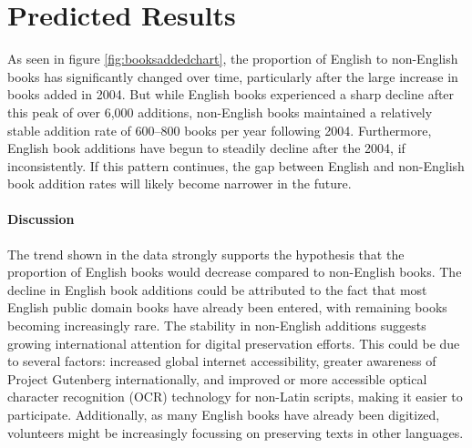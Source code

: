 \documentclass[11pt]{article}
\begin{document}
\section{Predicted Results}
As seen in figure \ref{fig:booksaddedchart}, the proportion of English to non-English books has significantly changed over time, particularly after the large increase in books added in 2004. But while English books experienced a sharp decline after this peak of over 6,000 additions, non-English books maintained a relatively stable addition rate of 600–800 books per year following 2004. Furthermore, English book additions have begun to steadily decline after the 2004, if inconsistently. If this pattern continues, the gap between English and non-English book addition rates will likely become narrower in the future.

\paragraph{Discussion} 
The trend shown in the data strongly supports the hypothesis that the proportion of English books would decrease compared to non-English books. The decline in English book additions could be attributed to the fact that most English public domain books have already been entered, with remaining books becoming increasingly rare. The stability in non-English additions suggests growing international attention for digital preservation efforts. This could be due to several factors: increased global internet accessibility, greater awareness of Project Gutenberg internationally, and improved or more accessible optical character recognition (OCR) technology for non-Latin scripts, making it easier to participate. Additionally, as many English books have already been digitized, volunteers might be increasingly focussing on preserving texts in other languages.
\end{document}
